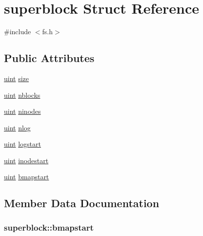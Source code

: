 \hypertarget{structsuperblock}{}\section{superblock Struct Reference}
\label{structsuperblock}


{\ttfamily \#include $<$fs.\+h$>$}

\subsection*{Public Attributes}
\begin{DoxyCompactItemize}
\item 
\hyperlink{custom__types_8h_a91ad9478d81a7aaf2593e8d9c3d06a14}{uint} \hyperlink{structsuperblock_a7c6e4d6da139ecee74eb7816d5d44fa6}{size}
\item 
\hyperlink{custom__types_8h_a91ad9478d81a7aaf2593e8d9c3d06a14}{uint} \hyperlink{structsuperblock_a2a27a7cfb54689f0e1dcd1788d049218}{nblocks}
\item 
\hyperlink{custom__types_8h_a91ad9478d81a7aaf2593e8d9c3d06a14}{uint} \hyperlink{structsuperblock_a355d2a1ebdc51f80820c23e69363cf42}{ninodes}
\item 
\hyperlink{custom__types_8h_a91ad9478d81a7aaf2593e8d9c3d06a14}{uint} \hyperlink{structsuperblock_aea92ae872785fd4fb39b903d9157aac5}{nlog}
\item 
\hyperlink{custom__types_8h_a91ad9478d81a7aaf2593e8d9c3d06a14}{uint} \hyperlink{structsuperblock_a460268b28aced19797e8d7b84aa60ebf}{logstart}
\item 
\hyperlink{custom__types_8h_a91ad9478d81a7aaf2593e8d9c3d06a14}{uint} \hyperlink{structsuperblock_adde361528f3905445974301b424611c1}{inodestart}
\item 
\hyperlink{custom__types_8h_a91ad9478d81a7aaf2593e8d9c3d06a14}{uint} \hyperlink{structsuperblock_a3c815dda5be6bda609389e76434171cc}{bmapstart}
\end{DoxyCompactItemize}


\subsection{Member Data Documentation}
\subsubsection[{\texorpdfstring{bmapstart}{bmapstart}}]{ superblock\+::bmapstart}\hypertarget{structsuperblock_a3c815dda5be6bda609389e76434171cc}{}\label{structsuperblock_a3c815dda5be6bda609389e76434171cc}
